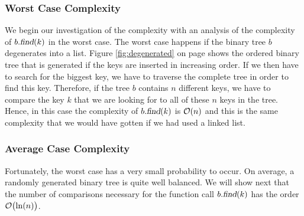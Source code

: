 \subsubsection{Worst Case Complexity}
We begin our investigation of the complexity with an analysis of the complexity of $b.\textsl{find}(k)$ 
in the worst case.  The worst case happens if the binary tree $b$ degenerates into a list.
Figure \ref{fig:degenerated} on page \pageref{fig:degenerated} shows the ordered binary tree that
is generated if the keys are inserted in increasing order.  If we then have to search for the
biggest key, we have to traverse the complete tree in order to find this key.  Therefore, if the
tree $b$ contains $n$ different keys, we have to compare the key $k$ that we are looking for to all
of these $n$ keys in the tree.  Hence, in this case the complexity of $b.\textsl{find}(k)$ is 
$\mathcal{O}(n)$ and this is the same complexity that we would have gotten if we had used a linked list.


\subsubsection{Average Case Complexity}
Fortunately, the worst case has a very small probability to occur. On average, a randomly generated
binary tree is quite well balanced.  We will show next that the number of comparisons necessary for
the function call $b.\textsl{find}(k)$ has the order $\mathcal{O}\bigl(\ln(n)\bigr)$.  





